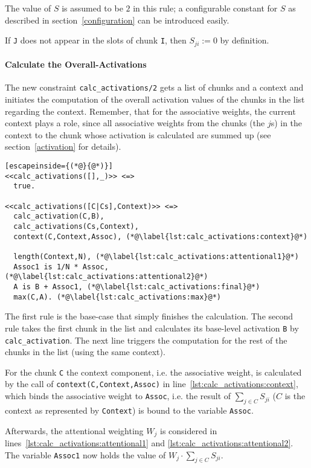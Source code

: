 The value of $S$ is assumed to be $2$ in this rule; a configurable constant for $S$ as described in section~\ref{configuration} can be introduced easily.

If \lstinline|J| does not appear in the slots of chunk \lstinline|I|, then $S_{ji} := 0$ by definition.

\paragraph{Calculate the Overall-Activations}

The new constraint \lstinline|calc_activations/2| gets a list of chunks and a context and initiates the computation of the overall activation values of the chunks in the list regarding the context. Remember, that for the associative weights, the current context plays a role, since all associative weights from the chunks (the $j$s) in the context to the chunk whose activation is calculated are summed up (see section~\ref{activation} for details).

\begin{lstlisting}[escapeinside={(*@}{@*)}]
<<calc_activations([],_)>> <=>
  true.
  
<<calc_activations([C|Cs],Context)>> <=> 
  calc_activation(C,B), 
  calc_activations(Cs,Context), 
  context(C,Context,Assoc), (*@\label{lst:calc_activations:context}@*)
  
  length(Context,N), (*@\label{lst:calc_activations:attentional1}@*)
  Assoc1 is 1/N * Assoc, (*@\label{lst:calc_activations:attentional2}@*)
  A is B + Assoc1, (*@\label{lst:calc_activations:final}@*)
  max(C,A). (*@\label{lst:calc_activations:max}@*)
\end{lstlisting}

The first rule is the base-case that simply finishes the calculation. The second rule takes the first chunk in the list and calculates its base-level activation \lstinline|B| by \lstinline|calc_activation|. The next line triggers the computation for the rest of the chunks in the list (using the same context).

For the chunk \lstinline|C| the context component, i.e. the associative weight, is calculated by the call of \lstinline|context(C,Context,Assoc)| in line~\ref{lst:calc_activations:context}, which binds the associative weight to \lstinline|Assoc|, i.e. the result of $\sum_{j \in C}{S_{ji}}$ ($C$ is the context as represented by \lstinline|Context|) is bound to the variable \lstinline|Assoc|.

Afterwards, the attentional weighting $W_j$ is considered in lines~\ref{lst:calc_activations:attentional1} and \ref{lst:calc_activations:attentional2}. The variable \lstinline|Assoc1| now holds the value of $W_j \cdot \sum_{j \in C}{S_{ji}}$.


